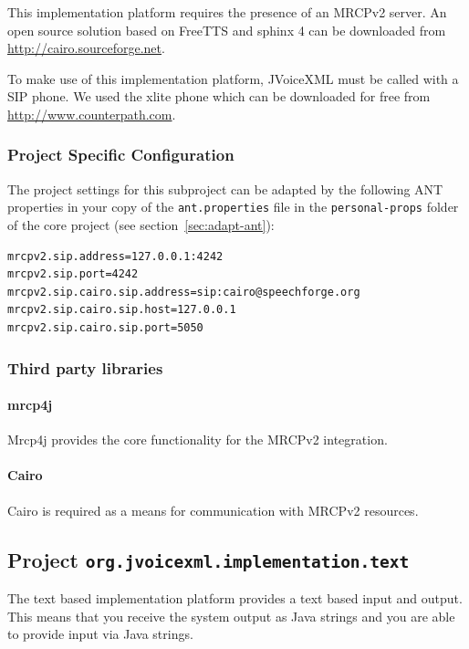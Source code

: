 \documentclass[11pt,a4paper]{article}
\begin{document}
This implementation platform requires the presence of an MRCPv2 server. An open
source solution based on FreeTTS and sphinx 4 can be downloaded from
\url{http://cairo.sourceforge.net}.

To make use of this implementation platform, JVoiceXML must be called with a SIP
phone. We used the xlite phone which can be downloaded for free from
\url{http://www.counterpath.com}.

\subsubsection{Project Specific Configuration}

The project settings for this subproject can be adapted by the following ANT
properties in your copy of the \texttt{ant.properties} file in the
\texttt{personal-props} folder of the core project (see 
section~\ref{sec:adapt-ant}):
\begin{lstlisting}
mrcpv2.sip.address=127.0.0.1:4242
mrcpv2.sip.port=4242
mrcpv2.sip.cairo.sip.address=sip:cairo@speechforge.org
mrcpv2.sip.cairo.sip.host=127.0.0.1
mrcpv2.sip.cairo.sip.port=5050
\end{lstlisting}

\subsubsection{Third party libraries}
\label{sec:mrcpv2-third-party-libr}

\paragraph{mrcp4j}

Mrcp4j provides the core functionality for the MRCPv2 integration.

\paragraph{Cairo}

Cairo is required as a means for communication with MRCPv2 resources.

\subsection{Project \texttt{org.jvoicexml.implementation.text}}

The text based implementation platform provides a text based input and output.
This means that you receive the system output as Java strings and you are able
to provide input via Java strings.
\end{document}
